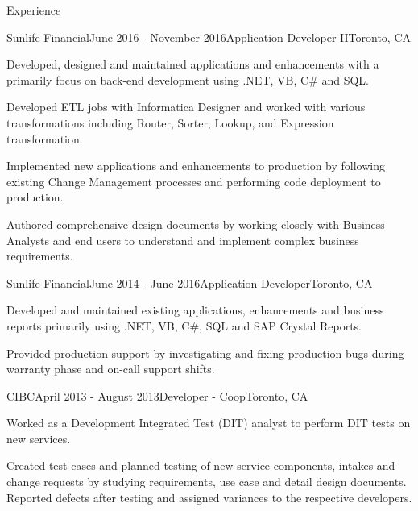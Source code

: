 \documentclass{resume} %
\begin{document}

\begin{rSection}{Experience}

\begin{rSubsection}{Sunlife Financial}{June 2016 - November 2016}{Application Developer II}{Toronto, CA}
\item Developed, designed and maintained applications and enhancements with a primarily focus on back-end development using .NET, VB, C\# and SQL.
\item Developed ETL jobs with Informatica Designer and worked with various transformations including Router, Sorter, Lookup, and Expression transformation. 
\item Implemented new applications and enhancements to production by following existing Change Management processes and performing code deployment to production. 
\item Authored comprehensive design documents by working closely with Business Analysts and end users to understand and implement complex business requirements. 

\end{rSubsection}


\begin{rSubsection}{Sunlife Financial}{June 2014 - June 2016}{Application Developer}{Toronto, CA}
\item Developed and maintained existing applications, enhancements and business reports primarily using .NET, VB, C\#, SQL and SAP Crystal Reports.  
\item Provided production support by investigating and fixing production bugs during warranty phase and on-call support shifts.  


\end{rSubsection}

\begin{rSubsection}{CIBC}{April 2013 - August 2013}{Developer - Coop}{Toronto, CA}
\item Worked as a Development Integrated Test (DIT) analyst to perform DIT tests on new services.
\item Created test cases and planned testing of new service components, intakes and change requests by studying requirements, use case and detail design documents. Reported defects after testing and assigned variances to the respective developers.

\end{rSubsection}

\end{rSection}
\end{document}
